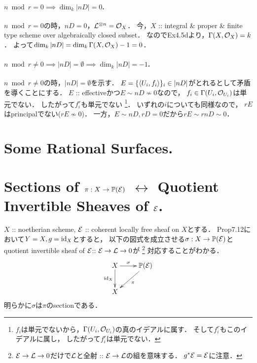 \documentclass[a4paper]{jsarticle}
\newcommand{\pbundle}{\mathbb{P}}
\begin{document}
    \paragraph{$n \bmod r=0 \implies \dim_k |nD|=0$.}
    $n \bmod r=0$の時，$nD=0$，$\mathcal{L}^{\otimes n}=\mathcal{O}_X$．
    今，$X$ :: integral \& proper \& finite type scheme over algebraically closed subset．
    なのでEx4.5dより，$\Gamma(X, \mathcal{O}_X)=k$．
    よって$\dim_k |nD|=\dim_k \Gamma(X, \mathcal{O}_X)-1=0$．

    \paragraph{$n \bmod r \neq 0 \implies |nD|=\emptyset \implies \dim_k |nD|=-1$.}
    $n \bmod r \neq 0$の時，$|nD|=\emptyset$を示す．
    $E=\{\langle U_i,f_i \rangle\}_i \in |nD|$がとれるとして矛盾を導くことにする．
    $E$ :: effectiveかつ$E \sim nD \not \sim 0$なので，
    $f_i \in \Gamma(U_i, \mathcal{O}_{U_i})$は単元でない．
    したがって$f_i^r$も単元でない
    \footnote
    {
        $f_i$は単元でないから，$\Gamma(U_i, \mathcal{O}_{U_i})$の真のイデアルに属す．
        そして$f_i^r$もこのイデアルに属し，
        したがって$f_i^r$は単元でない．
    }．
    いずれの$i$についても同様なので，
    $rE$はprincipalでない($rE \not \sim 0$)．
    一方，$E \sim nD, rD=0$だから$rE \sim rnD \sim 0$．

\section{Some Rational Surfaces.} %

\section{Sections of $\pi: X \to \pbundle(\shE)$
    $\leftrightarrow$ Quotient Invertible Sheaves of $\mathcal{E}$.} %

    $X$ :: noetherian scheme,
    $\mathcal{E}$ :: coherent locally free sheaf on $X$とする．
    Prop7.12において$Y=X, g=\mathrm{id}_{X}$とすると，
    以下の図式を成立させる$\sigma: X \to \pbundle(\shE)$と
    quotient invertible sheaf of $\mathcal{E} $:: $\mathcal{E} \to \mathcal{L} \to 0$が
    \footnote
    {
        $\mathcal{E} \to \mathcal{L} \to 0$だけで$\mathcal{L}$と全射 :: $\mathcal{E} \to \mathcal{L}$の組を意味する．
        $g^*\mathcal{E}=\mathcal{E}$に注意．
    }
    対応することがわかる．
    \[
        \xymatrix
        {
            X \ar[r]^-{\sigma}\ar[d]_-{\id{X}}& \pbundle(\shE) \ar[ld]^-{\pi} \\
            X
        }
    \]
    明らかに$\sigma$は$\pi$のsectionである．
\end{document}
